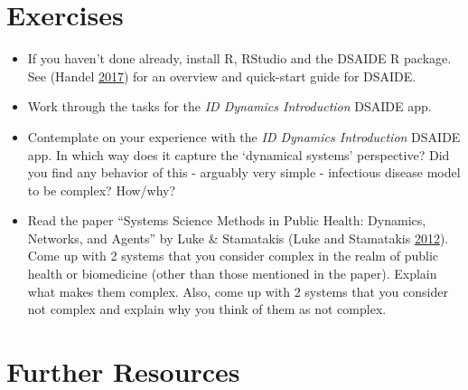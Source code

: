 \documentclass[]{book}
\providecommand{\tightlist}{%
  \setlength{\itemsep}{0pt}\setlength{\parskip}{0pt}}
\theoremstyle{definition}
\theoremstyle{definition}
\theoremstyle{definition}
\theoremstyle{remark}
\begin{document}
\section{Exercises}\label{exercises}

\begin{itemize}
\tightlist
\item
  If you haven't done already, install R, RStudio and the DSAIDE R
  package. See (Handel \protect\hyperlink{ref-handel17}{2017}) for an
  overview and quick-start guide for DSAIDE.
\item
  Work through the tasks for the \emph{ID Dynamics Introduction} DSAIDE
  app.
\item
  Contemplate on your experience with the \emph{ID Dynamics
  Introduction} DSAIDE app. In which way does it capture the `dynamical
  systems' perspective? Did you find any behavior of this - arguably
  very simple - infectious disease model to be complex? How/why?
\item
  Read the paper ``Systems Science Methods in Public Health: Dynamics,
  Networks, and Agents'' by Luke \& Stamatakis (Luke and Stamatakis
  \protect\hyperlink{ref-luke12}{2012}). Come up with 2 systems that you
  consider complex in the realm of public health or biomedicine (other
  than those mentioned in the paper). Explain what makes them complex.
  Also, come up with 2 systems that you consider not complex and explain
  why you think of them as not complex.
\end{itemize}

\section{Further Resources}\label{further-resources}
\end{document}
